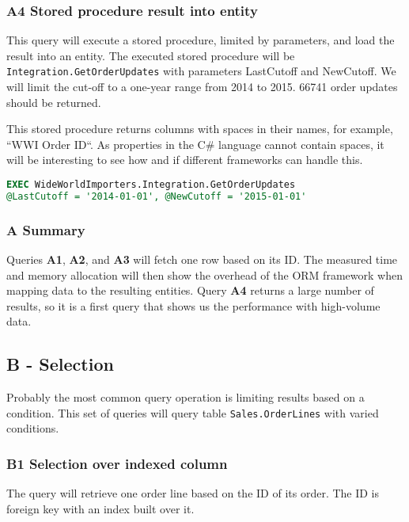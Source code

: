 \subsubsection*{A4 Stored procedure result into entity} \label{query:a4}
This query will execute a stored procedure, limited by parameters, and load the result into an entity.
The executed stored procedure will be \texttt{Integration.GetOrderUpdates} with parameters LastCutoff and NewCutoff. 
We will limit the cut-off to a one-year range from 2014 to 2015. 66741 order updates should be returned.

This stored procedure returns columns with spaces in their names, for example, ``WWI Order ID``. As properties in the C\# language cannot contain spaces, it will be interesting to see how and if different frameworks can handle this.

\begin{lstlisting}[language=SQL]
EXEC WideWorldImporters.Integration.GetOrderUpdates 
@LastCutoff = '2014-01-01', @NewCutoff = '2015-01-01'
\end{lstlisting}

\subsubsection*{A Summary}
Queries \textbf{A1}, \textbf{A2}, and \textbf{A3} will fetch one row based on its ID. The measured time and memory allocation will then show the overhead of the ORM framework when mapping data to the resulting entities. Query \textbf{A4} returns a large number of results, so it is a first query that shows us the performance with high-volume data.

\subsection{B - Selection}
Probably the most common query operation is limiting results based on a condition. This set of queries will query table \texttt{Sales.OrderLines} with varied conditions.

\subsubsection*{B1 Selection over indexed column} \label{query:b1}
The query will retrieve one order line based on the ID of its order. The ID is foreign key with an index built over it.

